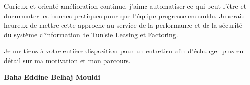 \documentclass[a4paper,11pt]{article}
\begin{document}
Curieux et orienté amélioration continue, j'aime automatiser ce qui peut l'être et documenter les bonnes pratiques pour que l'équipe progresse ensemble. Je serais heureux de mettre cette approche au service de la performance et de la sécurité du système d'information de Tunisie Leasing et Factoring.

Je me tiens à votre entière disposition pour un entretien afin d'échanger plus en détail sur ma motivation et mon parcours.

\vspace{0.8cm}

\begin{flushright}
{\bfseries Baha Eddine Belhaj Mouldi}
\end{flushright}
\end{document}
